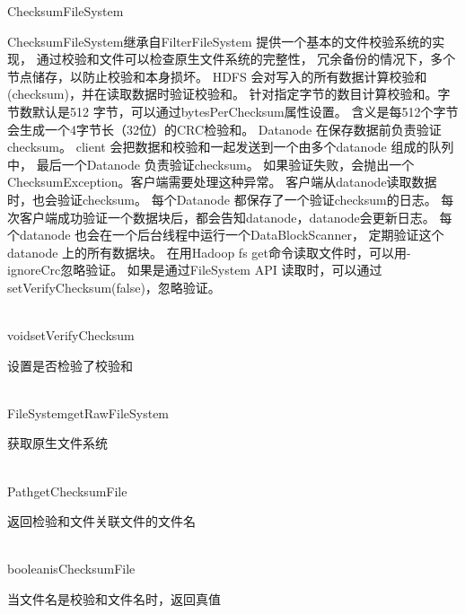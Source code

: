 \begin{XeClass}{ChecksumFileSystem}
   
 ChecksumFileSystem继承自FilterFileSystem
 提供一个基本的文件校验系统的实现，
 通过校验和文件可以检查原生文件系统的完整性，
 冗余备份的情况下，多个节点储存，以防止校验和本身损坏。
 HDFS 会对写入的所有数据计算校验和(checksum)，并在读取数据时验证校验和。
 针对指定字节的数目计算校验和。字节数默认是512 字节，可以通过bytesPerChecksum属性设置。
 含义是每512个字节会生成一个4字节长（32位）的CRC检验和。
 Datanode 在保存数据前负责验证checksum。
 client 会把数据和校验和一起发送到一个由多个datanode 组成的队列中，
 最后一个Datanode 负责验证checksum。
 如果验证失败，会抛出一个ChecksumException。客户端需要处理这种异常。   
 客户端从datanode读取数据时，也会验证checksum。
 每个Datanode 都保存了一个验证checksum的日志。
 每次客户端成功验证一个数据块后，都会告知datanode，datanode会更新日志。
 每个datanode 也会在一个后台线程中运行一个DataBlockScanner，
 定期验证这个 datanode 上的所有数据块。   
 在用Hadoop fs get命令读取文件时，可以用-ignoreCrc忽略验证。
 如果是通过FileSystem API 读取时，可以通过setVerifyChecksum(false)，忽略验证。 

  \begin{XeMethod}{\XePublic\\ }{void}{setVerifyChecksum}
       
 设置是否检验了校验和

  \end{XeMethod}

  \begin{XeMethod}{\XePublic\\ }{FileSystem}{getRawFileSystem}
       
 获取原生文件系统

  \end{XeMethod}

  \begin{XeMethod}{\XePublic\\ }{Path}{getChecksumFile}
       
 返回检验和文件关联文件的文件名

  \end{XeMethod}

  \begin{XeMethod}{\XePublic\\ }{boolean}{isChecksumFile}
       
 当文件名是校验和文件名时，返回真值

  \end{XeMethod}


\end{XeClass}
